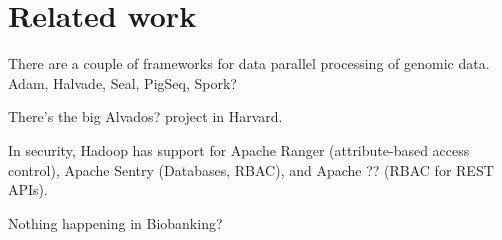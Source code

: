 \section{Related work}
There are a couple of frameworks for data parallel processing of genomic data. Adam, Halvade, Seal, PigSeq, Spork?

There's the big Alvados? project in Harvard.

In security, Hadoop has support for Apache Ranger (attribute-based access control), Apache Sentry (Databases, RBAC), and Apache ?? (RBAC for REST APIs).

Nothing happening in Biobanking?

